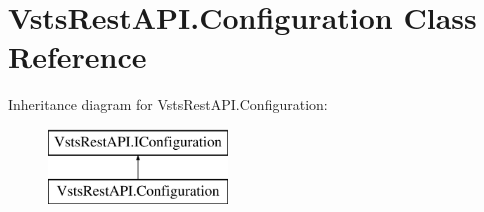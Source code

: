 \hypertarget{class_vsts_rest_a_p_i_1_1_configuration}{}\section{Vsts\+Rest\+A\+P\+I.\+Configuration Class Reference}
\label{class_vsts_rest_a_p_i_1_1_configuration}
Inheritance diagram for Vsts\+Rest\+A\+P\+I.\+Configuration\+:\begin{figure}[H]
\begin{center}
\leavevmode
\includegraphics[height=2.000000cm]{class_vsts_rest_a_p_i_1_1_configuration}
\end{center}
\end{figure}
